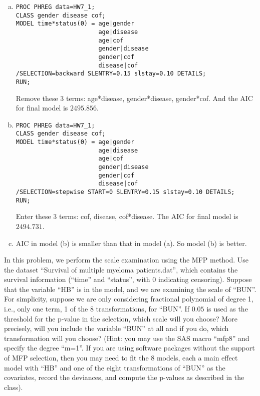 \documentclass{elegantbook}
\begin{document}
\begin{solution}
    \begin{enumerate}[(a)]
        \item \begin{verbatim}
PROC PHREG data=HW7_1;
CLASS gender disease cof; 
MODEL time*status(0) = age|gender 
                       age|disease 
                       age|cof 
                       gender|disease 
                       gender|cof 
                       disease|cof
/SELECTION=backward SLENTRY=0.15 slstay=0.10 DETAILS;
RUN;
        \end{verbatim}
        Remove these 3 terms: age*disease, gender*disease, gender*cof. 
        And the AIC for final model is $2495.856$. 
        \item \begin{verbatim}
PROC PHREG data=HW7_1;
CLASS gender disease cof; 
MODEL time*status(0) = age|gender 
                       age|disease 
                       age|cof 
                       gender|disease 
                       gender|cof 
                       disease|cof
/SELECTION=stepwise START=0 SLENTRY=0.15 slstay=0.10 DETAILS;
RUN;
        \end{verbatim}
        Enter these 3 terms: cof, disease, cof*disease.
        The AIC for final model is $2494.731$.
        \item AIC in model (b) is smaller than that in model (a). So model (b) is better.
    \end{enumerate}
\end{solution}

\begin{exercise*}[3]
    In this problem, we perform the scale examination using the MFP method. Use the dataset “Survival of multiple myeloma patients.dat”, which contains the survival information (“time” and “status”, with 0 indicating censoring). Suppose that the variable “HB” is in the model, and we are examining the scale of “BUN”. 
    For simplicity, suppose we are only considering fractional polynomial of degree 1, i.e., only one term, 1 of the 8 transformations, for “BUN”. If $0.05$ is used as the threshold for the p-value in the selection, which scale will you choose? More precisely, will you include the variable “BUN” at all and if you do, which transformation will you choose? 
    (Hint: you may use the SAS macro “mfp8” and specify the degree “m=1”. If you are using software packages without the support of MFP selection, then you may need to fit the 8 models, each a main effect model with “HB” and one of the eight transformations of “BUN” as the covariates, record the deviances, and compute the p-values as described in the class).
\end{exercise*}
\end{document}
